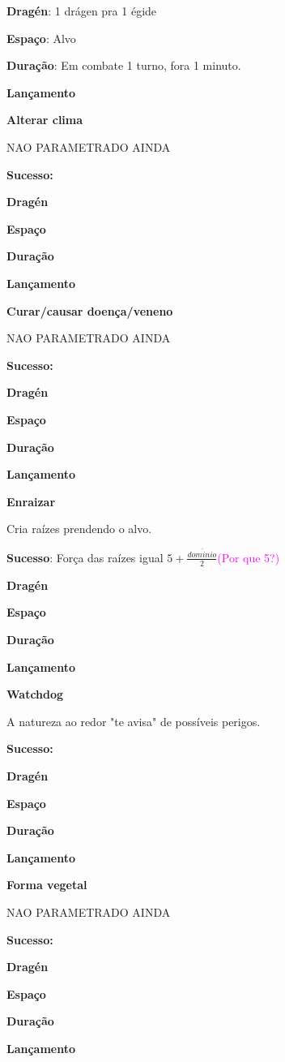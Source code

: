 \textbf{Dragén}: 1 drágen pra 1 égide

\textbf{Espaço}: Alvo

\textbf{Duração}: Em combate 1 turno, fora 1 minuto.

\textbf{Lançamento}
\bigskip

\textbf{Alterar clima}

NAO PARAMETRADO AINDA 

\textbf{Sucesso:}

\textbf{Dragén}

\textbf{Espaço}

\textbf{Duração}

\textbf{Lançamento}
\bigskip

\textbf{Curar/causar doença/veneno}

NAO PARAMETRADO AINDA 

\textbf{Sucesso:}

\textbf{Dragén}

\textbf{Espaço}

\textbf{Duração}

\textbf{Lançamento}
\bigskip

\textbf{Enraizar}

Cria raízes prendendo o alvo. 

\textbf{Sucesso}: Força das raízes igual $5+\frac{dom\acute{i}nio}{2}$\textcolor{magenta}{(Por que 5?)}

\textbf{Dragén}

\textbf{Espaço}

\textbf{Duração}

\textbf{Lançamento}
\bigskip

\textbf{Watchdog}

A natureza ao redor "te avisa" de possíveis perigos. 

\textbf{Sucesso:}

\textbf{Dragén}

\textbf{Espaço}

\textbf{Duração}

\textbf{Lançamento}
\bigskip


\textbf{Forma vegetal}

NAO PARAMETRADO AINDA 

\textbf{Sucesso:}

\textbf{Dragén}

\textbf{Espaço}

\textbf{Duração}

\textbf{Lançamento}
\bigskip
\newpage